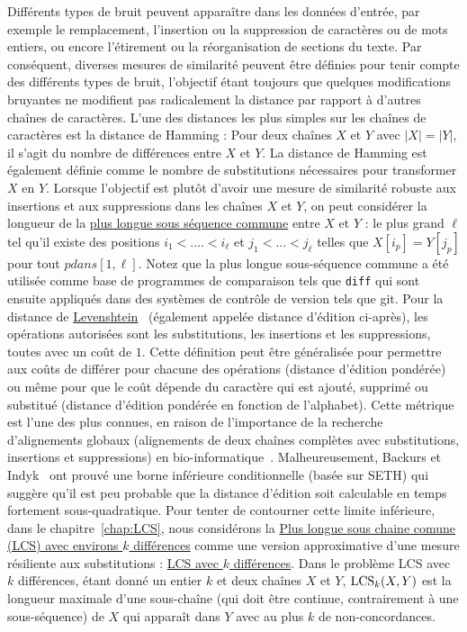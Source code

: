 Différents types de bruit peuvent apparaître dans les données d'entrée, par exemple le remplacement, l'insertion ou la suppression de caractères ou de mots entiers, ou encore l'étirement ou la réorganisation de sections du texte. Par conséquent, diverses mesures de similarité peuvent être définies pour tenir compte des différents types de bruit, l'objectif étant toujours que quelques modifications bruyantes ne modifient pas radicalement la distance par rapport à d'autres chaînes de caractères.
L'une des distances les plus simples sur les chaînes de caractères est la distance de Hamming : Pour deux chaînes $X$ et $Y$ avec $|X|=|Y|$, il s'agit du nombre de différences entre $X$ et $Y$. La distance de Hamming est également définie comme le nombre de substitutions nécessaires pour transformer $X$ en $Y$.
Lorsque l'objectif est plutôt d'avoir une mesure de similarité robuste aux insertions et aux suppressions dans les chaînes $X$ et $Y$, on peut considérer la longueur de la \underline{plus longue sous séquence commune} entre $X$ et $Y$ : le plus grand $\ell$ tel qu'il existe des positions $i_1<.... < i_\ell$ et $j_1< ... < j_\ell$ telles que $X[i_p] = Y[j_p]$ pour tout $p dans [1,\ell]$. Notez que la plus longue sous-séquence commune a été utilisée comme base de programmes de comparaison tels que \texttt{diff} qui sont ensuite appliqués dans des systèmes de contrôle de version tels que git.
Pour la distance de \underline{Levenshtein}~\cite{levenshtein1966binary} (également appelée distance d'édition ci-après), les opérations autorisées sont les substitutions, les insertions et les suppressions, toutes avec un coût de $1$. Cette définition peut être généralisée pour permettre aux coûts de différer pour chacune des opérations (distance d'édition pondérée) ou même pour que le coût dépende du caractère qui est ajouté, supprimé ou substitué (distance d'édition pondérée en fonction de l'alphabet). Cette métrique est l'une des plus connues, en raison de l'importance de la recherche d'alignements globaux (alignements de deux chaînes complètes avec substitutions, insertions et suppressions) en bio-informatique~\cite{Gusfield1997}.
Malheureusement, Backurs et Indyk~\cite{DBLP:conf/stoc/BackursI15} ont prouvé une borne inférieure conditionnelle (basée sur SETH) qui suggère qu'il est peu probable que la distance d'édition soit calculable en temps fortement sous-quadratique.
Pour tenter de contourner cette limite inférieure, dans le chapitre~\ref{chap:LCS}, nous considérons la \underline{Plus longue sous chaine comune (LCS) avec environs $k$ différences} comme une version approximative d'une mesure résiliente aux substitutions : \underline{LCS avec $k$ différences}. Dans le problème LCS avec $k$ différences, étant donné un entier $k$ et deux chaînes $X$ et $Y$, $\mathrm{LCS}_{k}(X,Y)$ est la longueur maximale d'une sous-chaîne (qui doit être continue, contrairement à une sous-séquence) de $X$ qui apparaît dans $Y$ avec au plus $k$ de non-concordances. 
